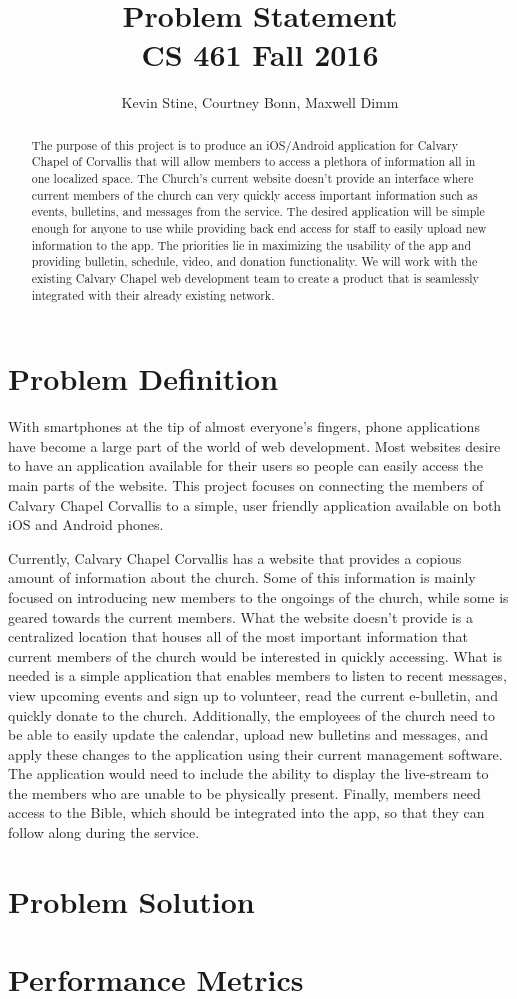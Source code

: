 \documentclass[letterpaper,10pt,draftclsnofoot,onecolumn,titlepage]{IEEEtran}
\def\name{Kevin Stine, Courtney Bonn, Maxwell Dimm}
\begin{document}
	\title{\huge Problem Statement \\ CS 461 Fall 2016}
	\author{\large \name}
	
	\maketitle
		\begin{abstract}The purpose of this project is to produce an iOS/Android application for Calvary Chapel of Corvallis that will allow members to access a plethora of information all in one localized space. 
		The Church's current website doesn't provide an interface where current members of the church can very quickly access important information such as events, bulletins, and messages from the service. 
		The desired application will be simple enough for anyone to use while providing back end access for staff to easily upload new information to the app. 
		The priorities lie in maximizing the usability of the app and providing bulletin, schedule, video, and donation functionality. 
		We will work with the existing Calvary Chapel web development team to create a product that is seamlessly integrated with their already existing network. 
		\end{abstract}
	
	\clearpage	
		
	\section*{Problem Definition}
		With smartphones at the tip of almost everyone's fingers, phone applications have become a large part of the world of web development. 
	Most websites desire to have an application available for their users so people can easily access the main parts of the website. 
	This project focuses on connecting the members of Calvary Chapel Corvallis to a simple, user friendly application available on both iOS and Android phones. 

	Currently, Calvary Chapel Corvallis has a website that provides a copious amount of information about the church. 
	Some of this information is mainly focused on introducing new members to the ongoings of the church, while some is geared towards the current members.
	What the website doesn't provide is a centralized location that houses all of the most important information that current members of the church would be interested in quickly accessing.
	What is needed is a simple application that enables members to listen to recent messages, view upcoming events and sign up to volunteer, read the current e-bulletin, and quickly donate to the church. 
	Additionally, the employees of the church need to be able to easily update the calendar, upload new bulletins and messages, and apply these changes to the application using their current management software. 
	The application would need to include the ability to display the live-stream to the members who are unable to be physically present. 
	Finally, members need access to the Bible, which should be integrated into the app, so that they can follow along during the service. 	
	
	\section*{Problem Solution}
	
	\section*{Performance Metrics}
	

 
\end{document}
